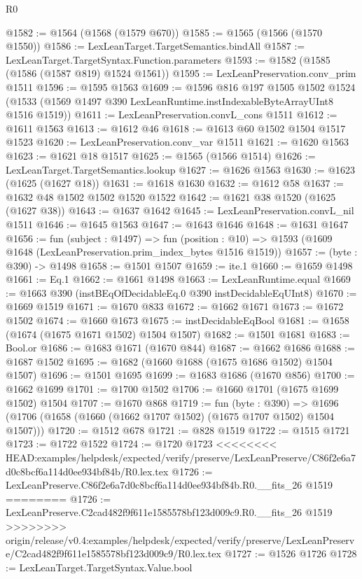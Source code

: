 \begin{lexlean}{R0}
\begin{coremodule}
{{{{{{{{{{{{{{{{{{{{{{{{{{{{{{{{{{{{{{{{{{{{{{{{{{{{{{{{{{{{{{{{{{{{{{{{{@1582 := @1564 (@1568 (@1579 @670))
@1585 := @1565 (@1566 (@1570 @1550))
@1586 := LexLeanTarget.TargetSemantics.bindAll
@1587 := LexLeanTarget.TargetSyntax.Function.parameters
@1593 := @1582 (@1585 (@1586 (@1587 @819) @1524 @1561))
@1595 := LexLeanPreservation.conv_prim @1511
@1596 := @1595 @1563
@1609 := @1596
    @816
    @197
    @1505
    @1502
    @1524
    (@1533 (@1569 @1497 @390 LexLeanRuntime.instIndexableByteArrayUInt8 @1516 @1519))
@1611 := LexLeanPreservation.convL_cons @1511
@1612 := @1611 @1563
@1613 := @1612 @46
@1618 := @1613 @60 @1502 @1504 @1517 @1523
@1620 := LexLeanPreservation.conv_var @1511
@1621 := @1620 @1563
@1623 := @1621 @18 @1517
@1625 := @1565 (@1566 @1514)
@1626 := LexLeanTarget.TargetSemantics.lookup
@1627 := @1626 @1563
@1630 := @1623 (@1625 (@1627 @18))
@1631 := @1618 @1630
@1632 := @1612 @58
@1637 := @1632 @48 @1502 @1502 @1520 @1522
@1642 := @1621 @38 @1520 (@1625 (@1627 @38))
@1643 := @1637 @1642
@1645 := LexLeanPreservation.convL_nil @1511
@1646 := @1645 @1563
@1647 := @1643 @1646
@1648 := @1631 @1647
@1656 := fun (subject : @1497) =>
  fun (position : @10) => @1593 (@1609 @1648 (LexLeanPreservation.prim_index_bytes @1516 @1519))
@1657 := (byte : @390) -> @1498
@1658 := @1501 @1507
@1659 := ite.{1}
@1660 := @1659 @1498
@1661 := Eq.{1}
@1662 := @1661 @1498
@1663 := LexLeanRuntime.equal
@1669 := @1663 @390 (instBEqOfDecidableEq.{0} @390 instDecidableEqUInt8)
@1670 := @1669 @1519
@1671 := @1670 @833
@1672 := @1662 @1671
@1673 := @1672 @1502
@1674 := @1660 @1673
@1675 := instDecidableEqBool
@1681 := @1658 (@1674 (@1675 @1671 @1502) @1504 @1507)
@1682 := @1501 @1681
@1683 := Bool.or
@1686 := @1683 @1671 (@1670 @844)
@1687 := @1662 @1686
@1688 := @1687 @1502
@1695 := @1682 (@1660 @1688 (@1675 @1686 @1502) @1504 @1507)
@1696 := @1501 @1695
@1699 := @1683 @1686 (@1670 @856)
@1700 := @1662 @1699
@1701 := @1700 @1502
@1706 := @1660 @1701 (@1675 @1699 @1502) @1504
@1707 := @1670 @868
@1719 := fun (byte : @390) =>
  @1696 (@1706 (@1658 (@1660 (@1662 @1707 @1502) (@1675 @1707 @1502) @1504 @1507)))
@1720 := @1512 @678
@1721 := @828 @1519
@1722 := @1515 @1721
@1723 := @1722 @1522
@1724 := @1720 @1723
<<<<<<<< HEAD:examples/helpdesk/expected/verify/preserve/LexLeanPreserve/C86f2e6a7d0c8bcf6a114d0ee934bf84b/R0.lex.tex
@1726 := LexLeanPreserve.C86f2e6a7d0c8bcf6a114d0ee934bf84b.R0.__fits_26 @1519
========
@1726 := LexLeanPreserve.C2cad482f9f611e1585578bf123d009c9.R0.__fits_26 @1519
>>>>>>>> origin/release/v0.4:examples/helpdesk/expected/verify/preserve/LexLeanPreserve/C2cad482f9f611e1585578bf123d009c9/R0.lex.tex
@1727 := @1526 @1726
@1728 := LexLeanTarget.TargetSyntax.Value.bool
}}}}}}}}}}}}}}}}}}}}}}}}}}}}}}}}}}}}}}}}}}}}}}}}}}}}}}}}}}}}}}}}}}}}}}}}}
\end{coremodule}
\end{lexlean}

